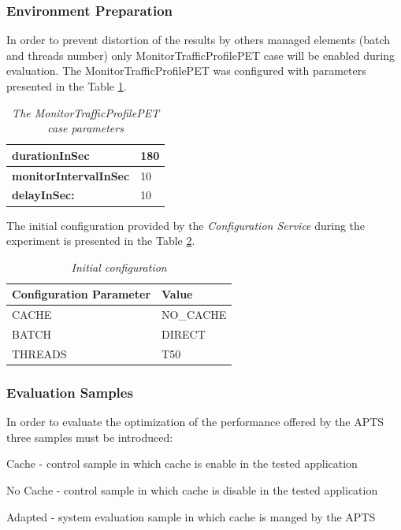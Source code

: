\documentclass[10pt,a4paper]{article}
\let\tempone\itemize
\let\temptwo\enditemize
\renewenvironment{itemize}{\tempone\addtolength{\itemsep}{-0.4\baselineskip}}{\temptwo}
\begin{document}
\subsubsection{Environment Preparation} 

In order to prevent distortion of the results by others managed elements (batch and threads number) only MonitorTrafficProfilePET case will be enabled during evaluation. The MonitorTrafficProfilePET was configured with parameters presented in the Table \ref{evaluationtestconf}.

\begin{table}[!htb]
\def\arraystretch{1.5}
\caption{\textit{The MonitorTrafficProfilePET case parameters}} \label{evaluationtestconf}
\begin{tabularx}{\textwidth}{X|X}

\textbf{durationInSec} & 180 \\ \hline
\textbf{monitorIntervalInSec} & 10 \\ \hline
\textbf{delayInSec:} & 10\\
\end{tabularx}
\end{table}

The initial configuration provided by the \textit{Configuration Service} during the experiment is presented in the Table \ref{cacheinitconf}.
\begin{table}[!htb]
\caption{\textit{Initial configuration}} \label{cacheinitconf}
\begin{tabularx}{\textwidth}{X|X}
\textbf{Configuration Parameter} & \textbf{Value} \\ \hline
CACHE & NO\_CACHE \\ \hline
BATCH & DIRECT\\ \hline
THREADS & T50\\
\end{tabularx}
\end{table}


\subsubsection{Evaluation Samples} \label{evaluationsamplescache}

In order to evaluate the optimization of the performance offered by the APTS three  samples must be introduced: 
\begin{itemize}
\item Cache - control sample in which cache is enable in the tested application
\item No Cache - control sample in which cache is disable in the tested application
\item Adapted - system evaluation sample in which cache is manged by the APTS
\end{itemize}
\end{document}
